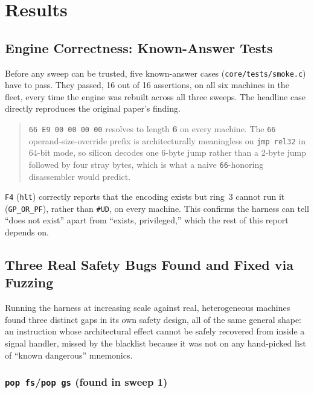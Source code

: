 \documentclass[11pt]{article}
\newcommand{\code}[1]{\texttt{#1}}
\begin{document}
\section{Results}

\subsection{Engine Correctness: Known-Answer Tests}
\label{sec:result-correctness}

Before any sweep can be trusted, five known-answer cases
(\code{core/tests/smoke.c}) have to pass. They passed, 16 out of 16
assertions, on all six machines in the fleet, every time the engine was
rebuilt across all three sweeps. The headline case directly reproduces
the original paper's finding.

\begin{quote}
\code{66 E9 00 00 00 00} resolves to length \textbf{6} on every machine.
The \code{66} operand-size-override prefix is architecturally
meaningless on \code{jmp rel32} in 64-bit mode, so silicon decodes one
6-byte jump rather than a 2-byte jump followed by four stray bytes, which
is what a naive \code{66}-honoring disassembler would predict.
\end{quote}

\code{F4} (\code{hlt}) correctly reports that the encoding exists but
ring~3 cannot run it (\code{GP\_OR\_PF}), rather than \code{\#UD}, on
every machine. This confirms the harness can tell ``does not exist''
apart from ``exists, privileged,'' which the rest of this report depends
on.

\subsection{Three Real Safety Bugs Found and Fixed via Fuzzing}
\label{sec:result-bugs}

Running the harness at increasing scale against real, heterogeneous
machines found three distinct gaps in its own safety design, all of the
same general shape: an instruction whose architectural effect cannot be
safely recovered from inside a signal handler, missed by the blacklist
because it was not on any hand-picked list of ``known dangerous''
mnemonics.

\subsubsection{\code{pop fs}/\code{pop gs} (found in sweep 1)}
\end{document}
